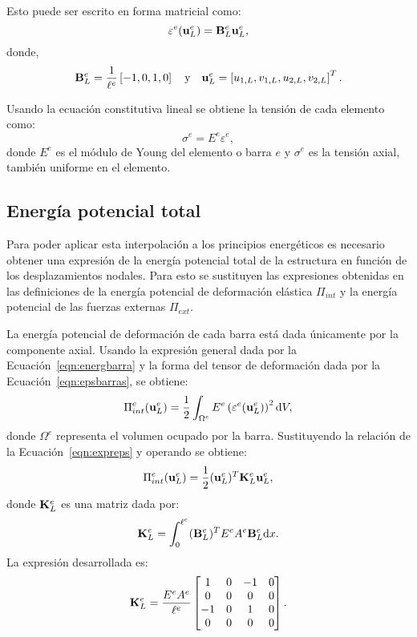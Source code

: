 Esto puede ser escrito en forma matricial como:
%
\begin{equation} \label{eqn:expreps}
\varepsilon^e ({\bf u}^e_L) = {\bf B}_L^e {\bf u}^e_L,
\end{equation}
%
donde,
%
\begin{equation}
{\bf B}_L^e = \frac{1}{\ell^e} \left[-1, 0, 1, 0\right]
\quad \text{y} \quad
{\bf u}_L^e = \left[u_{1,L}, v_{1,L}, u_{2,L}, v_{2,L}\right]^T.
\end{equation}

Usando la ecuación constitutiva lineal se obtiene la tensión de cada elemento como:
%
\begin{equation}\label{eqn:barraeccons}
\sigma^e = E^e \varepsilon^e,
\end{equation}
donde $E^e$ es el módulo de Young del elemento o barra $e$ y $\sigma^e$ es la tensión axial, también uniforme en el elemento.


\subsection{Energía potencial total}

Para poder aplicar esta interpolación a los principios energéticos es necesario obtener una expresión de la energía potencial total de la estructura en función de los desplazamientos nodales. %
%
Para esto se sustituyen las expresiones obtenidas en las definiciones de la energía potencial de deformación elástica $\Pi_{int}$ y la energía potencial de las fuerzas externas $\Pi_{ext}$.

La energía potencial de deformación de cada barra está dada únicamente por la componente axial. Usando la expresión general dada por la Ecuación~\eqref{eqn:energbarra} y la forma del tensor de deformación dada por la Ecuación~\eqref{eqn:epsbarras}, se obtiene:
%
\begin{equation}
\Pi_{int}^e (\bfu_L^e) %
%
= \frac{1}{2} \int_{\Omega^e} E^e \left(\varepsilon^e (\bfu_L^e) \right)^2 \dif V ,
%
\end{equation}
%
donde $\Omega^e$ representa el volumen ocupado por la barra. %
%
Sustituyendo la relación de la Ecuación~\eqref{eqn:expreps} y operando se obtiene:
%
\begin{equation}
\Pi_{int}^e({\bf u}_L^e) = \frac{1}{2} ({\bf u}_L^e)^T {\bf K}_L^e {\bf u}_L^e ,
\end{equation}
%
donde ${\bf K}_L^e$ es una matriz dada por:
%
\begin{equation}\label{eqn:defK}
 {\bf K}_L^e = \int_{0}^{\ell^e} ({\bf B}_L^e)^T E^e A^e {\bf B}_L^e {\text{d}} x.
\end{equation}
%
La expresión desarrollada es:
%
\begin{equation}
{\bf K}_L^e = \frac{E^e A^e}{\ell^e} 
\left[
\begin{matrix}
1 & 0 & -1 & 0 \\
0 & 0 & 0 & 0\\
-1 & 0 &  1 & 0\\
0 & 0 & 0 & 0
\end{matrix}
\right].
\end{equation}
%

